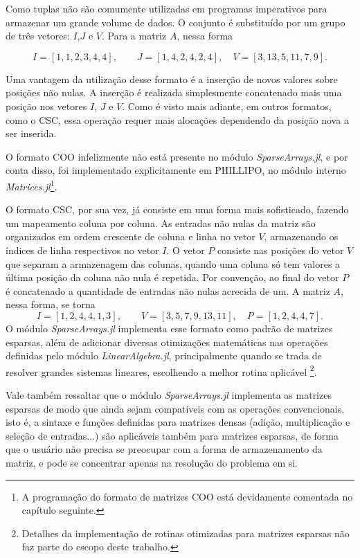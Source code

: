 Como tuplas não são comumente utilizadas em programas imperativos para armazenar um grande volume de dados. O conjunto é substituído por um grupo de três vetores: $I$,$J$ e $V$. Para a matriz $A$, nessa forma


\begin{equation}
    I =  [1, 1, 2, 3, 4, 4], \qquad J = [1, 4, 2, 4, 2, 4], \quad V = [3, 13, 5, 11, 7, 9].
    \label{eq:coo_2}
\end{equation}

Uma vantagem da utilização desse formato é a inserção de novos valores sobre posições não nulas. A inserção é realizada simplesmente concatenado mais uma posição nos vetores $I$, $J$ e $V$. Como é visto mais adiante, em outros formatos, como o CSC, essa operação requer mais alocações dependendo da posição nova a ser inserida.

O formato COO infelizmente não está presente no módulo \emph{SparseArrays.jl}, e por conta disso, foi implementado explicitamente em PHILLIPO, no módulo interno \emph{Matrices.jl}\footnote{A programação do formato de matrizes COO está devidamente comentada no capítulo seguinte.}.

O formato CSC, por sua vez, já consiste em uma forma mais sofisticado, fazendo um mapeamento coluna por coluna. As entradas não nulas da matriz são organizados em ordem crescente  de coluna e linha no vetor $V$, armazenando os índices de linha respectivos no vetor $I$. O vetor $P$ consiste nas posições do vetor $V$ que separam a armazenagem das colunas, quando uma coluna só tem valores a última posição da coluna não nula é repetida. Por convenção, ao final do vetor $P$ é concatenado a quantidade de entradas não nulas acrecida de um. A matriz $A$, nessa forma, se torna
\begin{equation}
    I = [1, 2, 4, 4, 1, 3], \qquad V = [3, 5, 7, 9, 13, 11], \quad P = [1,2,4,4,7].
    \label{eq:coo_3}
\end{equation}
O módulo \emph{SparseArrays.jl} implementa esse formato como padrão de matrizes esparsas, além de adicionar diversas otimizações matemáticas nas operações definidas pelo módulo \emph{LinearAlgebra.jl}, principalmente quando se trada de resolver grandes sistemas lineares, escolhendo a melhor rotina aplicável \footnote{Detalhes da implementação de rotinas otimizadas para matrizes esparsas não faz parte do escopo deste trabalho.}.

Vale também ressaltar que o módulo \emph{SparseArrays.jl} implementa as matrizes esparsas de modo que ainda sejam compatíveis com as operações convencionais, isto é, a sintaxe e funções definidas para matrizes densas (adição, multiplicação e seleção de entradas...) são aplicáveis também para matrizes esparsas, de forma que o usuário não precisa se preocupar com a forma de armazenamento da matriz, e pode se concentrar apenas na resolução do problema em si.


